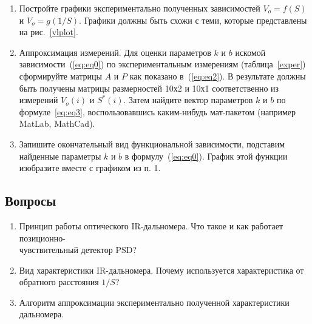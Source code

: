 \documentclass[12pt]{article}
\begin{document}
\begin{enumerate}
    \item Постройте графики экспериментально полученных зависимостей \(V_o=f(S)\) и \(V_o=g(1/S)\). Графики должны быть схожи с теми, которые представлены на рис.~\ref{vlplot}.
    \item Аппроксимация измерений. Для оценки параметров \(k\) и \(b\) искомой зависимости~(\ref{eq:eq0}) по экспериментальным измерениям (таблица~\ref{exper}) сформируйте матрицы \(A\) и \(P\) как показано в~(\ref{eq:eq2}). В результате должны быть получены матрицы размерностей 10х2 и 10х1 соответственно из измерений \(V_o(i)\) и \(S^*(i)\). Затем найдите вектор параметров \(k\) и \(b\) по формуле~\ref{eq:eq3}, воспользовавшись каким-нибудь мат-пакетом (например MatLab, MathCad).
    \item Запишите окончательный вид функциональной зависимости, подставим найденные параметры \(k\) и \(b\) в формулу~(\ref{eq:eq0}). График этой функции изобразите вместе с графиком из п. 1.
\end{enumerate}

\subsection{Вопросы}

\begin{enumerate}
    \item Принцип работы оптического IR-дальномера. Что такое и как работает позиционно-\\чувствительный детектор PSD?
    \item Вид характеристики IR-дальномера. Почему используется характеристика от обратного расстояния \(1/S\)?
    \item Алгоритм аппроксимации экспериментально полученной характеристики дальномера.
\end{enumerate}
\end{document}

